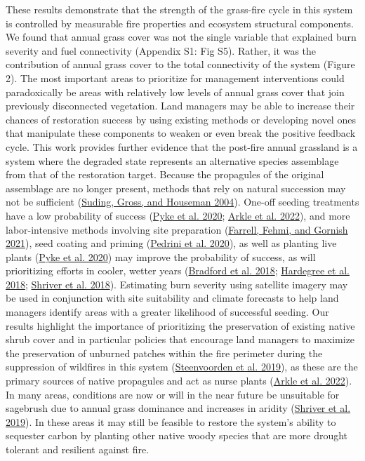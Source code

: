 \documentclass[
  12pt,
]{article}
\begin{document}
These results demonstrate that the strength of the grass-fire cycle in
this system is controlled by measurable fire properties and ecosystem
structural components. We found that annual grass cover was not the
single variable that explained burn severity and fuel connectivity
(Appendix S1: Fig S5). Rather, it was the contribution of annual grass
cover to the total connectivity of the system (Figure 2). The most
important areas to prioritize for management interventions could
paradoxically be areas with relatively low levels of annual grass cover
that join previously disconnected vegetation. Land managers may be able
to increase their chances of restoration success by using existing
methods or developing novel ones that manipulate these components to
weaken or even break the positive feedback cycle. This work provides
further evidence that the post-fire annual grassland is a system where
the degraded state represents an alternative species assemblage from
that of the restoration target. Because the propagules of the original
assemblage are no longer present, methods that rely on natural
succession may not be sufficient
(\protect\hyperlink{ref-Suding2004}{Suding, Gross, and Houseman 2004}).
One-off seeding treatments have a low probability of success
(\protect\hyperlink{ref-Pyke2020}{Pyke et al. 2020};
\protect\hyperlink{ref-Arkle2022}{Arkle et al. 2022}), and more
labor-intensive methods involving site preparation
(\protect\hyperlink{ref-Farrell2021}{Farrell, Fehmi, and Gornish 2021}),
seed coating and priming (\protect\hyperlink{ref-Pedrini2020}{Pedrini et
al. 2020}), as well as planting live plants
(\protect\hyperlink{ref-Pyke2020}{Pyke et al. 2020}) may improve the
probability of success, as will prioritizing efforts in cooler, wetter
years (\protect\hyperlink{ref-Bradford2018}{Bradford et al. 2018};
\protect\hyperlink{ref-Hardegree2018}{Hardegree et al. 2018};
\protect\hyperlink{ref-Shriver2018}{Shriver et al. 2018}). Estimating
burn severity using satellite imagery may be used in conjunction with
site suitability and climate forecasts to help land managers identify
areas with a greater likelihood of successful seeding. Our results
highlight the importance of prioritizing the preservation of existing
native shrub cover and in particular policies that encourage land
managers to maximize the preservation of unburned patches within the
fire perimeter during the suppression of wildfires in this system
(\protect\hyperlink{ref-Steenvoorden2019}{Steenvoorden et al. 2019}), as
these are the primary sources of native propagules and act as nurse
plants (\protect\hyperlink{ref-Arkle2022}{Arkle et al. 2022}). In many
areas, conditions are now or will in the near future be unsuitable for
sagebrush due to annual grass dominance and increases in aridity
(\protect\hyperlink{ref-Shriver2019}{Shriver et al. 2019}). In these
areas it may still be feasible to restore the system's ability to
sequester carbon by planting other native woody species that are more
drought tolerant and resilient against fire.
\end{document}
